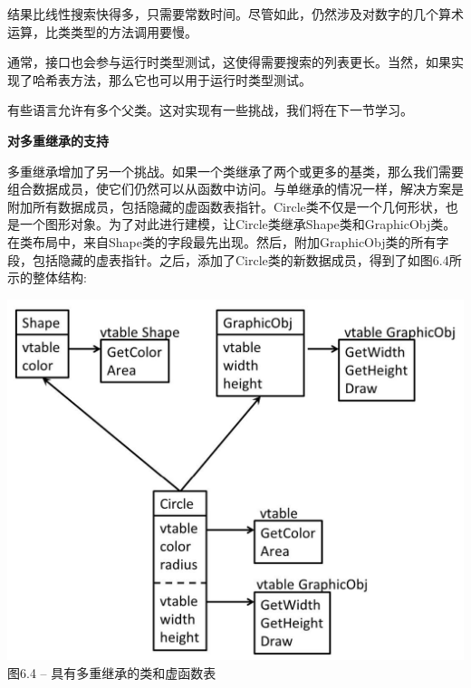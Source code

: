 结果比线性搜索快得多，只需要常数时间。尽管如此，仍然涉及对数字的几个算术运算，比类类型的方法调用要慢。\par

通常，接口也会参与运行时类型测试，这使得需要搜索的列表更长。当然，如果实现了哈希表方法，那么它也可以用于运行时类型测试。\par

有些语言允许有多个父类。这对实现有一些挑战，我们将在下一节学习。\par

\hspace*{\fill} \par %
\textbf{对多重继承的支持}

多重继承增加了另一个挑战。如果一个类继承了两个或更多的基类，那么我们需要组合数据成员，使它们仍然可以从函数中访问。与单继承的情况一样，解决方案是附加所有数据成员，包括隐藏的虚函数表指针。Circle类不仅是一个几何形状，也是一个图形对象。为了对此进行建模，让Circle类继承Shape类和GraphicObj类。在类布局中，来自Shape类的字段最先出现。然后，附加GraphicObj类的所有字段，包括隐藏的虚表指针。之后，添加了Circle类的新数据成员，得到了如图6.4所示的整体结构:\par

\hspace*{\fill} \par %
\begin{center}
\includegraphics{content/2/chapter6/images/4.jpg}\\
图6.4 – 具有多重继承的类和虚函数表
\end{center}

